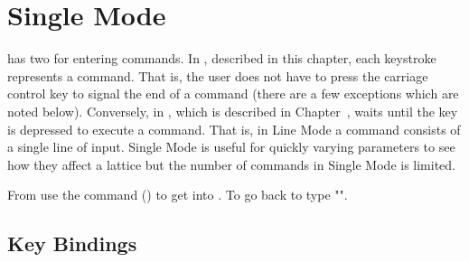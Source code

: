 \chapter{Single Mode}
\label{c:single}

\tao has two  for entering commands. In ,
described in this chapter, each keystroke represents a command.  That
is, the user does not have to press the carriage control key to signal
the end of a command (there are a few exceptions which are noted
below). Conversely, in , which is described in
Chapter~, \tao waits until the  key is
depressed to execute a command. That is, in Line Mode a command
consists of a single line of input.  Single Mode is useful for quickly
varying parameters to see how they affect a lattice but the number of
commands in Single Mode is limited.

From  use the  command ()
to get into . To go back to  type
"".

\section{Key Bindings}
\label{s:key.bind}

